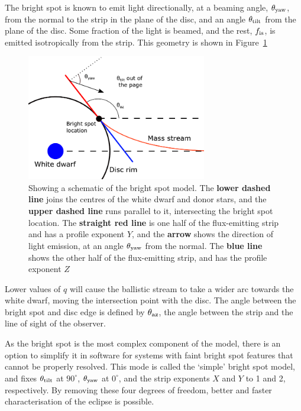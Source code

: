 The bright spot is known to emit light directionally, at a beaming angle, $\theta_{\rm yaw}$, from the normal to the strip in the plane of the disc, and an angle $\theta_{\rm tilt}$ from the plane of the disc.
Some fraction of the light is beamed, and the rest, $f_{\rm is}$, is emitted isotropically from the strip. This geometry is shown in Figure~\ref{fig:modelling:bright spot schematic}

\begin{figure}
    \centering
    \includegraphics[width=0.7\textwidth]{figures/modelling/bright_spot_schematic.pdf}
    \caption{Showing a schematic of the bright spot model. The {\bf lower dashed line} joins the centres of the white dwarf and donor stars, and the {\bf upper dashed line} runs parallel to it, intersecting the bright spot location. The {\bf straight red line} is one half of the flux-emitting strip and has a profile exponent $Y$, and the {\bf arrow} shows the direction of light emission, at an angle $\theta_{\rm yaw}$ from the normal. The {\bf blue line} shows the other half of the flux-emitting strip, and has the profile exponent $Z$}
    \label{fig:modelling:bright spot schematic}
\end{figure}

Lower values of $q$ will cause the ballistic stream to take a wider arc towards the white dwarf, moving the intersection point with the disc. The angle between the bright spot and disc edge is defined by $\theta_{\rm az}$, the angle between the strip and the line of sight of the observer.

As the bright spot is the most complex component of the model, there is an option to simplify it in software for systems with faint bright spot features that cannot be properly resolved.
This mode is called the `simple' bright spot model, and fixes $\theta_{\rm tilt}$ at $90^\circ$, $\theta_{\rm yaw}$ at $0^\circ$, and the strip exponents $X$ and $Y$ to 1 and 2, respectively. By removing these four degrees of freedom, better and faster characterisation of the eclipse is possible.

